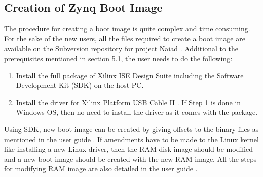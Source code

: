 \subsection{Creation of Zynq Boot Image}
The procedure for creating a boot image is quite complex and time consuming. For the sake of the new users, all the files required to create a boot image are available on the Subversion repository for project Naiad \cite{web:svnGimme}. Additional to the prerequisites mentioned in section 5.1, the user needs to do the following:\begin{enumerate}
\item Install the full package of Xilinx ISE Design Suite\cite{web:downloadISE} including the Software Development Kit (SDK) on the host PC.
\item Install the driver for Xilinx Platform USB Cable II \cite{web:driverCable}. If Step 1 is done in Windows OS, then no need to install the driver as it comes with the package.
\end{enumerate}

Using SDK, new boot image can be created by giving offsets to the binary files as mentioned in the user guide \cite{web:svnGimme}. If amendments have to be made to the Linux kernel like installing a new Linux driver, then the RAM disk image should be modified and a new boot image should be created with the new RAM image. All the steps for modifying RAM image are also detailed in the user guide \cite{svnGimme}.
